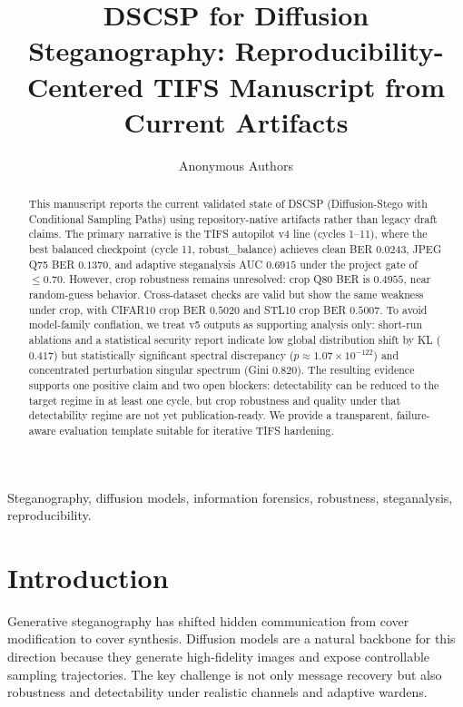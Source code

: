 \documentclass[journal]{IEEEtran}
\title{DSCSP for Diffusion Steganography: \nA Reproducibility-Centered TIFS Manuscript from Current Artifacts}
\author{Anonymous Authors}
\begin{document}
\maketitle

\begin{abstract}
This manuscript reports the current validated state of DSCSP (Diffusion-Stego with Conditional Sampling Paths) using repository-native artifacts rather than legacy draft claims. The primary narrative is the TIFS autopilot v4 line (cycles 1--11), where the best balanced checkpoint (cycle 11, robust\_balance) achieves clean BER $0.0243$, JPEG Q75 BER $0.1370$, and adaptive steganalysis AUC $0.6915$ under the project gate of $\leq 0.70$. However, crop robustness remains unresolved: crop Q80 BER is $0.4955$, near random-guess behavior. Cross-dataset checks are valid but show the same weakness under crop, with CIFAR10 crop BER $0.5020$ and STL10 crop BER $0.5007$. To avoid model-family conflation, we treat v5 outputs as supporting analysis only: short-run ablations and a statistical security report indicate low global distribution shift by KL ($0.417$) but statistically significant spectral discrepancy ($p\approx 1.07\times10^{-122}$) and concentrated perturbation singular spectrum (Gini $0.820$). The resulting evidence supports one positive claim and two open blockers: detectability can be reduced to the target regime in at least one cycle, but crop robustness and quality under that detectability regime are not yet publication-ready. We provide a transparent, failure-aware evaluation template suitable for iterative TIFS hardening.
\end{abstract}

\begin{IEEEkeywords}
Steganography, diffusion models, information forensics, robustness, steganalysis, reproducibility.
\end{IEEEkeywords}

\section{Introduction}
Generative steganography has shifted hidden communication from cover modification to cover synthesis. Diffusion models \cite{ho2020denoising,song2020denoising} are a natural backbone for this direction because they generate high-fidelity images and expose controllable sampling trajectories. The key challenge is not only message recovery but also robustness and detectability under realistic channels and adaptive wardens.
\end{document}
